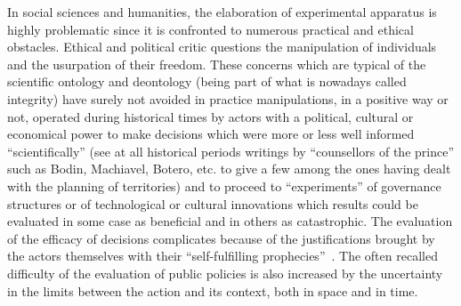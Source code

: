 \documentclass[10pt]{article}
\begin{document}
In social sciences and humanities, the elaboration of experimental apparatus is highly problematic since it is confronted to numerous practical and ethical obstacles. Ethical and political critic questions the manipulation of individuals and the usurpation of their freedom. These concerns which are typical of the scientific ontology and deontology (being part of what is nowadays called integrity) have surely not avoided in practice manipulations, in a positive way or not, operated during historical times by actors with a political, cultural or economical power to make decisions which were more or less well informed ``scientifically'' (see at all historical periods writings by ``counsellors of the prince'' such as Bodin, Machiavel, Botero, etc. to give a few among the ones having dealt with the planning of territories) and to proceed to ``experiments'' of governance structures or of technological or cultural innovations which results could be evaluated in some case as beneficial and in others as catastrophic. The evaluation of the efficacy of decisions complicates because of the justifications brought by the actors themselves with their ``self-fulfilling prophecies''~\citep{rist1970student}. The often recalled difficulty of the evaluation of public policies is also increased by the uncertainty in the limits between the action and its context, both in space and in time.
\end{document}

